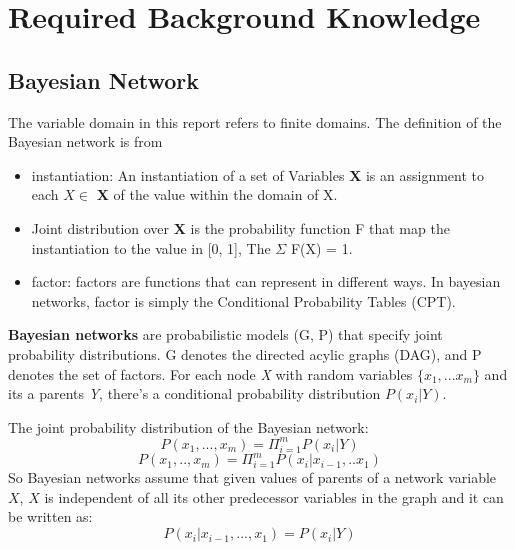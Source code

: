 \newpage
\section{Required Background Knowledge}
    \subsection{Bayesian Network}
    The variable domain in this report refers to finite domains. The definition of the Bayesian network is from \cite{2008-literature-review}\\
    \begin{itemize}
        \item instantiation: An instantiation of a set of Variables \textbf{X} is an assignment to each $X \in$ \textbf{X} of the value within the domain of X.
        \item Joint distribution over \textbf{X} is the probability function F that map the instantiation to the value in [0, 1], The $\Sigma$ F(X) = 1.
        \item factor: factors are functions that can represent in different ways. In bayesian networks, factor is simply the Conditional Probability Tables (CPT).
    \end{itemize}
    \textbf{Bayesian networks} are probabilistic models (G, P) that specify joint probability distributions. G denotes the directed acylic graphs (DAG), and P denotes the set of factors. For each node \textit{X} with random variables $\{x_{1}, ... x_{m}\}$ and its a parents \textit{Y}, there's a conditional probability distribution $P(x_{i}|Y)$. \par
    
    The joint probability distribution of the Bayesian network: 
    $$P(x_{1}, ... , x_{m}) = \Pi_{i = 1}^{m} P(x_{i}|Y)$$
    $$P(x_{1},.., x_{m}) = \Pi_{i = 1}^{m}P(x_{i}|x_{i - 1}, .. x_{1})$$
    So Bayesian networks assume that given values of parents of a network variable $X$, $X$ is independent of all its other predecessor variables in the graph and it can be written as: $$P(x_{i}|x_{i- 1}, ..., x_{1}) = P(x_{i}|Y)$$
    
